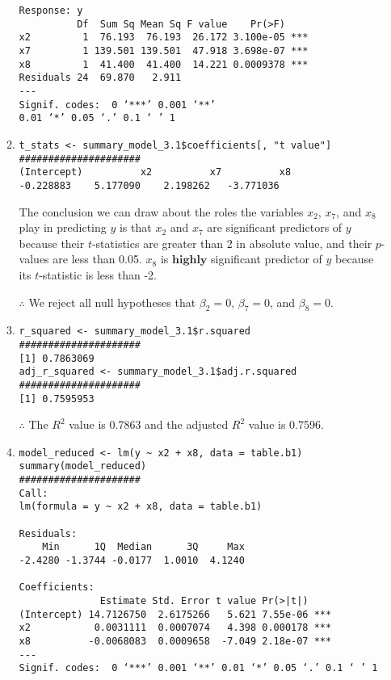\documentclass[12pt]{article}
\begin{document}
\begin{enumerate}[1.]
\begin{enumerate}
\begin{verbatim}
Response: y
          Df  Sum Sq Mean Sq F value    Pr(>F)    
x2         1  76.193  76.193  26.172 3.100e-05 ***
x7         1 139.501 139.501  47.918 3.698e-07 ***
x8         1  41.400  41.400  14.221 0.0009378 ***
Residuals 24  69.870   2.911                      
---
Signif. codes:  0 ‘***’ 0.001 ‘**’ 
0.01 ‘*’ 0.05 ‘.’ 0.1 ‘ ’ 1
                    \end{verbatim}
                    \item 
                    \begin{verbatim}
t_stats <- summary_model_3.1$coefficients[, "t value"]
#####################
(Intercept)          x2          x7          x8 
-0.228883    5.177090    2.198262   -3.771036 
                    \end{verbatim}
                    The conclusion we can draw about the roles the variables $x_2$, $x_7$, and $x_8$ play in predicting $y$ is that
                    $x_2$ and $x_7$ are significant predictors of $y$ because their $t$-statistics are greater than 2 in absolute value,
                    and their $p$-values are less than 0.05. $x_8$ is $\textbf{highly}$ significant predictor of $y$ because its $t$-statistic is less than -2.

                    $\therefore$ We reject all null hypotheses that $\beta_2 = 0$, $\beta_7 = 0$, and $\beta_8 = 0$.
                    \item  
                    \begin{verbatim}
r_squared <- summary_model_3.1$r.squared
#####################
[1] 0.7863069
adj_r_squared <- summary_model_3.1$adj.r.squared
#####################
[1] 0.7595953
                    \end{verbatim}
                    $\therefore$ The $R^2$ value is 0.7863 and the adjusted $R^2$ value is 0.7596.
                    \item \begin{verbatim}
model_reduced <- lm(y ~ x2 + x8, data = table.b1)
summary(model_reduced)
#####################
Call:
lm(formula = y ~ x2 + x8, data = table.b1)

Residuals:
    Min      1Q  Median      3Q     Max 
-2.4280 -1.3744 -0.0177  1.0010  4.1240 

Coefficients:
              Estimate Std. Error t value Pr(>|t|)    
(Intercept) 14.7126750  2.6175266   5.621 7.55e-06 ***
x2           0.0031111  0.0007074   4.398 0.000178 ***
x8          -0.0068083  0.0009658  -7.049 2.18e-07 ***
---
Signif. codes:  0 ‘***’ 0.001 ‘**’ 0.01 ‘*’ 0.05 ‘.’ 0.1 ‘ ’ 1


\end{verbatim}
\end{enumerate}
\end{enumerate}
\end{document}
